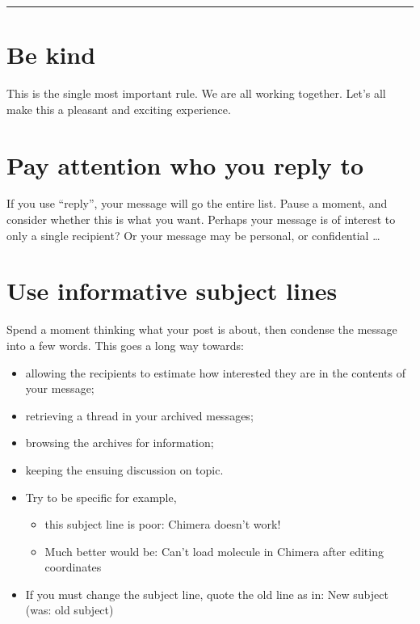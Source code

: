 \documentclass[]{book}
\providecommand{\tightlist}{%
  \setlength{\itemsep}{0pt}\setlength{\parskip}{0pt}}
\begin{document}
\begin{center}\rule{0.5\linewidth}{\linethickness}\end{center}

\section{Be kind}\label{be-kind}

This is the single most important rule. We are all working together.
Let's all make this a pleasant and exciting experience.

\section{Pay attention who you reply
to}\label{pay-attention-who-you-reply-to}

If you use ``reply'', your message will go the entire list. Pause a
moment, and consider whether this is what you want. Perhaps your message
is of interest to only a single recipient? Or your message may be
personal, or confidential \ldots{}

\section{Use informative subject
lines}\label{use-informative-subject-lines}

Spend a moment thinking what your post is about, then condense the
message into a few words. This goes a long way towards:

\begin{itemize}
\tightlist
\item
  allowing the recipients to estimate how interested they are in the
  contents of your message;
\item
  retrieving a thread in your archived messages;
\item
  browsing the archives for information;
\item
  keeping the ensuing discussion on topic.
\item
  Try to be specific for example,

  \begin{itemize}
  \tightlist
  \item
    this subject line is poor: Chimera doesn't work!
  \item
    Much better would be: Can't load molecule in Chimera after editing
    coordinates
  \end{itemize}
\item
  If you must change the subject line, quote the old line as in: New
  subject (was: old subject)
\end{itemize}
\end{document}
